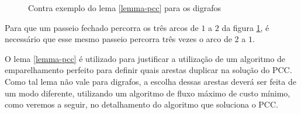 \documentclass[12pt, a4paper]{article}
\begin{document}
    \begin{figure}[h]
        \centering
        \caption{Contra exemplo do lema \ref{lemma-pcc} para os digrafos}
        \label{counter-lemma}
    \end{figure}

    Para que um passeio fechado percorra os três arcos de $1$ a $2$ da figura \ref{counter-lemma}, é necessário que esse mesmo passeio percorra três vezes o arco de $2$ a $1$.

    O lema \ref{lemma-pcc} é utilizado para justificar a utilização de um algoritmo de emparelhamento perfeito para definir quais arestas duplicar na solução do PCC.
    Como tal lema não vale para digrafos, a escolha dessas arestas deverá ser feita de um modo diferente, utilizando um algoritmo de fluxo máximo de custo mínimo, como veremos a seguir, no detalhamento do algoritmo que soluciona o PCC.
\end{document}
